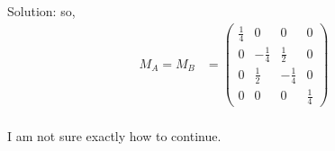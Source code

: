\begin{homeworkProblem}
\begin{enumerate}[a.]
\begin{callout}{Solution:}
            so,
            \begin{align*}
                M_A = M_B &=
                \begin{pmatrix} \frac{1}{4} & 0 & 0 & 0 \\ 0 & -\frac{1}{4} & \frac{1}{2} & 0 \\ 0 & \frac{1}{2} & -\frac{1}{4} & 0 \\ 0 & 0 & 0 & \frac{1}{4} \end{pmatrix} \\
            \end{align*}

            I am not sure exactly how to continue. 

        \end{callout}
\end{enumerate}
\end{homeworkProblem}

